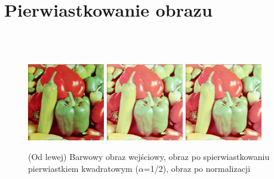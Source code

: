 \documentclass[final,a4paper,openany,12pt]{mwbk}
\begin{document}
\section{ Pierwiastkowanie obrazu}

\hfill
\\\\
\indent

\begin{figure}[H]
	\begin{center}
		\includegraphics[width=0.3\textwidth]{1/1Color_Sqrt_Original}
		\includegraphics[width=0.3\textwidth]{1/1Color_Sqrt_Result}
		\includegraphics[width=0.3\textwidth]{1/1Color_Sqrt_Result_Norm}
	\end{center}
	\caption{(Od lewej) Barwowy obraz wejściowy, obraz po spierwiastkowaniu pierwiastkiem kwadratowym ($\alpha$=1/2), obraz po normalizacji }
\end{figure}
\end{document}
